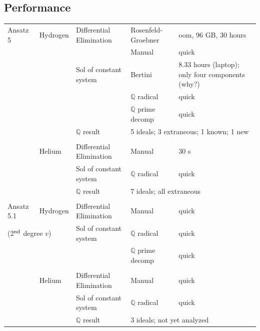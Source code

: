 \documentclass{article}
\begin{document}
\def\R32003{$F_{32003}$}
\subsection*{Performance}
\begin{longtable}{lllll}
Ansatz 5   &Hydrogen       &Differential Elimination &Rosenfeld-Groebner    &oom, 96 GB, 30 hours\\
           &               &                         &Manual                &quick\\
           &               &Sol of constant system   &Bertini               &8.33 hours (laptop); only four components (why?)\\
           &               &                         &$\mathbb{Q}$ radical             &quick\\
           &               &                         &$\mathbb{Q}$ prime decomp        &quick\\
           &               &$\mathbb{Q}$ result                 &\multicolumn{2}{l}{5 ideals; 3 extraneous; 1 known; 1 new}\\
           &               &                         &                      &\\
           &Helium         &Differential Elimination &Manual                &30 s\\
           &               &Sol of constant system   &$\mathbb{Q}$ radical            &quick\\
           &               &$\mathbb{Q}$ result                 &\multicolumn{2}{l}{7 ideals; all extraneous}\\
           &               &                         &                      &\\
Ansatz 5.1 &Hydrogen       &Differential Elimination &Manual                &quick\\
\multicolumn{2}{l}{(2$^{\rm nd}$ degree $v$)} &Sol of constant system   &$\mathbb{Q}$ radical            &quick\\
           &               &                         &$\mathbb{Q}$ prime decomp        &quick\\
           &               &                         &                      &\\
           &Helium         &Differential Elimination &Manual                &quick\\
           &               &Sol of constant system   &$\mathbb{Q}$ radical            &quick\\
           &               &$\mathbb{Q}$ result                 &\multicolumn{2}{l}{3 ideals; not yet analyzed}\\

\end{longtable}
\end{document}
